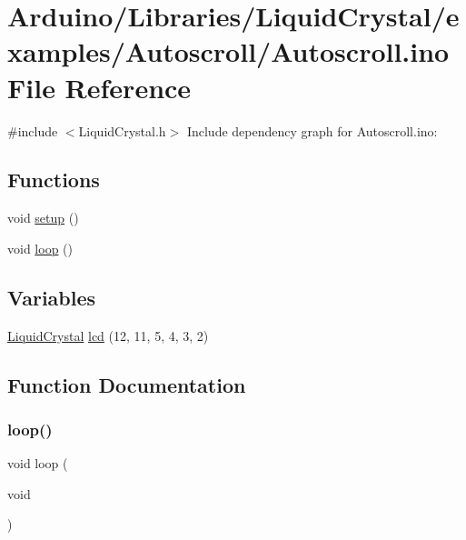 \hypertarget{_autoscroll_8ino}{}\section{Arduino/\+Libraries/\+Liquid\+Crystal/examples/\+Autoscroll/\+Autoscroll.ino File Reference}
\label{_autoscroll_8ino}
{\ttfamily \#include $<$Liquid\+Crystal.\+h$>$}\newline
Include dependency graph for Autoscroll.\+ino\+:
\subsection*{Functions}
\begin{DoxyCompactItemize}
\item 
void \hyperlink{_autoscroll_8ino_a4fc01d736fe50cf5b977f755b675f11d}{setup} ()
\item 
void \hyperlink{_autoscroll_8ino_afe461d27b9c48d5921c00d521181f12f}{loop} ()
\end{DoxyCompactItemize}
\subsection*{Variables}
\begin{DoxyCompactItemize}
\item 
\hyperlink{class_liquid_crystal}{Liquid\+Crystal} \hyperlink{_autoscroll_8ino_a7226623e632d4109904c86009c9f3b60}{lcd} (12, 11, 5, 4, 3, 2)
\end{DoxyCompactItemize}


\subsection{Function Documentation}
\mbox{\label{_autoscroll_8ino_afe461d27b9c48d5921c00d521181f12f}} 
\subsubsection{\texorpdfstring{loop()}{loop()}}
{\footnotesize\ttfamily void loop (\begin{DoxyParamCaption}\item[{void}]{ }\end{DoxyParamCaption})}

